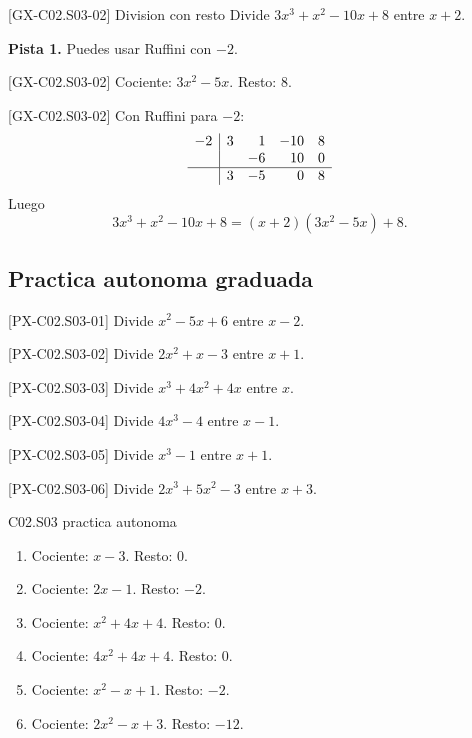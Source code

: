\begin{guidedexercise}{[GX-C02.S03-02] Division con resto}
Divide \(3x^3+x^2-10x+8\) entre \(x+2\).

\textbf{Pista 1.} Puedes usar Ruffini con \(-2\).
\end{guidedexercise}

\begin{shortanswer}{[GX-C02.S03-02]}
Cociente: \(3x^2-5x\). Resto: \(8\).
\end{shortanswer}

\begin{fullsolution}{[GX-C02.S03-02]}
Con Ruffini para \(-2\):
\[
\begin{array}{r|rrrr}
-2 & 3 & 1 & -10 & 8 \\
   &   & -6 & 10 & 0 \\
\hline
   & 3 & -5 & 0 & 8
\end{array}
\]
Luego
\[
3x^3+x^2-10x+8=(x+2)(3x^2-5x)+8.
\]
\end{fullsolution}

\subsection*{Practica autonoma graduada}
\begin{exercise}{[PX-C02.S03-01] Divide \(x^2-5x+6\) entre \(x-2\).}
\end{exercise}
\begin{exercise}{[PX-C02.S03-02] Divide \(2x^2+x-3\) entre \(x+1\).}
\end{exercise}
\begin{exercise}{[PX-C02.S03-03] Divide \(x^3+4x^2+4x\) entre \(x\).}
\end{exercise}
\begin{exercise}{[PX-C02.S03-04] Divide \(4x^3-4\) entre \(x-1\).}
\end{exercise}
\begin{exercise}{[PX-C02.S03-05] Divide \(x^3-1\) entre \(x+1\).}
\end{exercise}
\begin{exercise}{[PX-C02.S03-06] Divide \(2x^3+5x^2-3\) entre \(x+3\).}
\end{exercise}

\begin{shortanswer}{C02.S03 practica autonoma}
\begin{enumerate}[label=\textbf{PX-C02.S03-\arabic*:}, leftmargin=*]
  \item Cociente: \(x-3\). Resto: \(0\).
  \item Cociente: \(2x-1\). Resto: \(-2\).
  \item Cociente: \(x^2+4x+4\). Resto: \(0\).
  \item Cociente: \(4x^2+4x+4\). Resto: \(0\).
  \item Cociente: \(x^2-x+1\). Resto: \(-2\).
  \item Cociente: \(2x^2-x+3\). Resto: \(-12\).
\end{enumerate}
\end{shortanswer}

